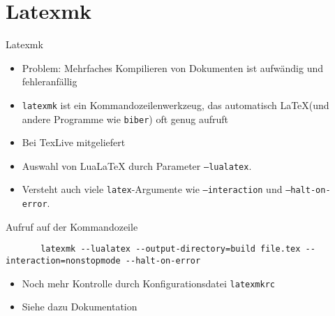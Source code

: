 \section{Latexmk}

\begin{frame}[fragile]{
  Latexmk
  \hfill
}
  \begin{itemize}
    \item Problem: Mehrfaches Kompilieren von Dokumenten ist aufwändig und fehleranfällig
    \item \texttt{latexmk} ist ein Kommandozeilenwerkzeug, das automatisch \LaTeX (und andere Programme wie \texttt{biber}) oft genug aufruft
    \item Bei TexLive mitgeliefert
    \item Auswahl von LuaLaTeX durch Parameter \texttt{--lualatex}.
    \item Versteht auch viele \texttt{latex}-Argumente wie \texttt{--interaction} und \texttt{--halt-on-error}.
  \end{itemize}

  \begin{block}{Aufruf auf der Kommandozeile}
    \begin{lstlisting}
       latexmk --lualatex --output-directory=build file.tex --interaction=nonstopmode --halt-on-error
    \end{lstlisting}
  \end{block}

  \begin{itemize}
    \item Noch mehr Kontrolle durch Konfigurationsdatei \texttt{latexmkrc}
    \item Siehe dazu Dokumentation
  \end{itemize}
\end{frame}
 
